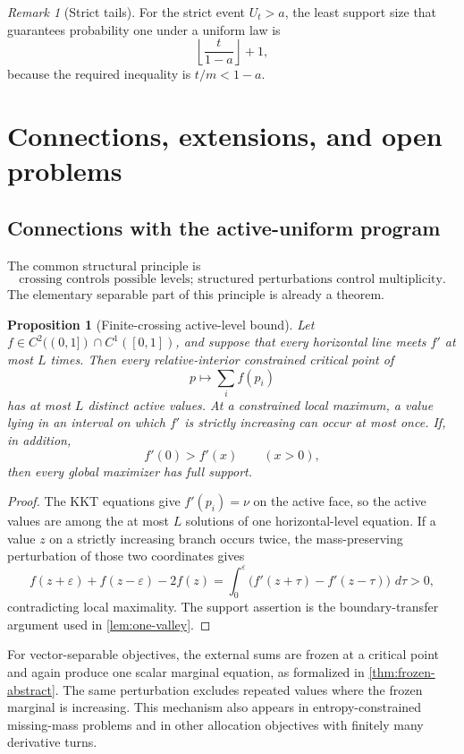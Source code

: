 \documentclass[11pt]{article}
\theoremstyle{plain}
\newtheorem{proposition}[theorem]{Proposition}
\theoremstyle{definition}
\theoremstyle{remark}
\newtheorem{remark}[theorem]{Remark}
\newcommand{\dd}{\,d}
\begin{document}
\begin{remark}[Strict tails]
For the strict event \(U_t>a\), the least support size that guarantees probability one under a uniform law is
\[
\left\lfloor\frac{t}{1-a}\right\rfloor+1,
\]
because the required inequality is \(t/m<1-a\).
\end{remark}

\section{Connections, extensions, and open problems}

\subsection{Connections with the active-uniform program}

The common structural principle is
\[
\boxed{\text{crossing controls possible levels; structured perturbations control multiplicity.}}
\]
The elementary separable part of this principle is already a theorem.

\begin{proposition}[Finite-crossing active-level bound]\label{prop:finite-crossing}
Let \(f\in C^2((0,1])\cap C^1([0,1])\), and suppose that every horizontal line meets \(f'\) at most \(L\) times.  Then every relative-interior constrained critical point of
\[
p\longmapsto\sum_i f(p_i)
\]
has at most \(L\) distinct active values.  At a constrained local maximum, a value lying in an interval on which \(f'\) is strictly increasing can occur at most once.  If, in addition,
\[
f'(0)>f'(x)\qquad(x>0),
\]
then every global maximizer has full support.
\end{proposition}

\begin{proof}
The KKT equations give \(f'(p_i)=\nu\) on the active face, so the active values are among the at most \(L\) solutions of one horizontal-level equation.  If a value \(z\) on a strictly increasing branch occurs twice, the mass-preserving perturbation of those two coordinates gives
\[
f(z+\varepsilon)+f(z-\varepsilon)-2f(z)
=\int_0^\varepsilon
\bigl(f'(z+\tau)-f'(z-\tau)\bigr)\,\dd\tau>0,
\]
contradicting local maximality.  The support assertion is the boundary-transfer argument used in \cref{lem:one-valley}.
\end{proof}

For vector-separable objectives, the external sums are frozen at a critical point and again produce one scalar marginal equation, as formalized in \cref{thm:frozen-abstract}.  The same perturbation excludes repeated values where the frozen marginal is increasing.  This mechanism also appears in entropy-constrained missing-mass problems \cite{BerendKontorovichZagdanski2017} and in other allocation objectives with finitely many derivative turns.
\end{document}
